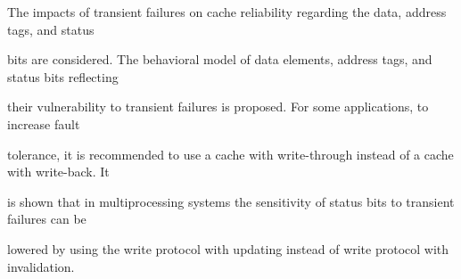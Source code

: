  \titelee{\tit}{\aut} %












\noindent


The impacts of transient failures on cache reliability regarding the data, address tags, and status


bits are considered. The behavioral model of data elements, address tags, and status bits reflecting


their vulnerability to transient failures is proposed. For some applications, to increase fault


tolerance, it is recommended to use a cache with write-through instead of a cache with write-back. It


is shown that in multiprocessing systems the sensitivity of status bits to transient failures can be


lowered by using the write protocol with updating instead of write protocol with invalidation.

























 




 \def\tit{RGB-CHARACTERIZATION OF COLOR PERCEPTION SPACE}







 \def\aut{O.~Arkhipov and Z.~Zykova }








